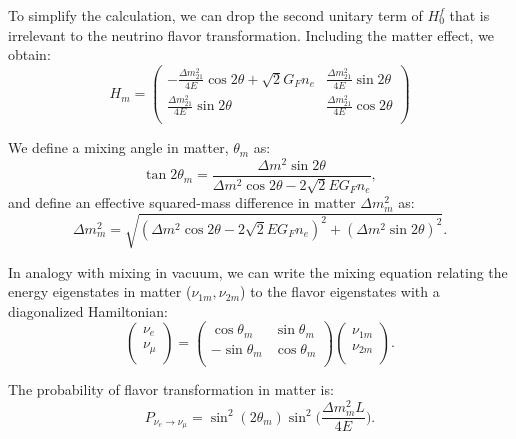 To simplify the calculation, we can drop the second unitary term of $H^f_0$ that is irrelevant to the neutrino flavor transformation. Including the matter effect, we obtain:
\begin{equation}\label{eq:Hm}
	H_m = \begin{pmatrix}
		-\frac{\Delta m_{21}^2}{4E}\cos 2\theta+\sqrt 2G_Fn_e & \frac{\Delta m_{21}^2}{4E}\sin 2\theta\\
		\frac{\Delta m_{21}^2}{4E}\sin 2\theta &\frac{\Delta m_{21}^2}{4E}\cos 2\theta\\
	\end{pmatrix}
\end{equation}

We define a mixing angle in matter, $\theta_m$ as:
\begin{equation}\label{eq:thetaM}
	\tan 2\theta_m = \frac{\Delta m^2\sin2\theta}{\Delta m^2\cos2\theta-2\sqrt 2E G_Fn_e},
\end{equation}
and define an effective squared-mass difference in matter $\Delta m^2_m$ as:
\begin{equation}
	\Delta m^2_m = \sqrt{(\Delta m^2\cos2\theta - 2\sqrt 2EG_Fn_e)^2+(\Delta m^2\sin2\theta)^2}.
\end{equation}

In analogy with mixing in vacuum, we can write the mixing equation relating the energy eigenstates in matter ($\nu_{1m},\nu_{2m}$) to the flavor eigenstates with a diagonalized Hamiltonian:
\begin{equation}\label{eq:matter_mixing}
	\begin{pmatrix}
		\nu_e\\
		\nu_\mu\\
	\end{pmatrix}
	= \begin{pmatrix}
		\cos\theta_m & \sin\theta_m\\
		-\sin\theta_m & \cos\theta_m \\
	\end{pmatrix}
	\begin{pmatrix}
		\nu_{1m}\\
		\nu_{2m}\\
	\end{pmatrix}.
\end{equation}

The probability of flavor transformation in matter is:
\begin{equation}
	P_{\nu_e\to\nu_{\mu}}=\sin^2(2\theta_m)\sin^2\Big(\frac{\Delta m_m^2L}{4E}\Big).
\end{equation}

